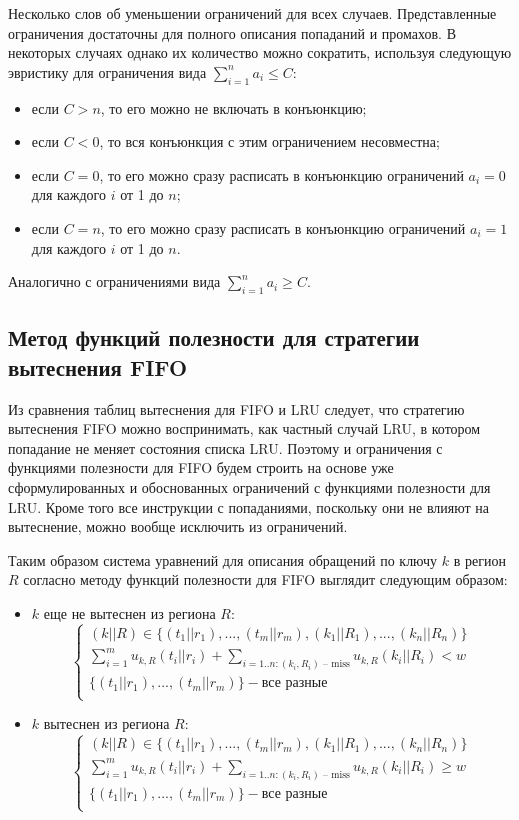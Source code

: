 \documentclass[14pt]{extreport}
\newcommand{\LRU}{\textsf{LRU}\xspace}
\newcommand{\FIFO}{\textsf{FIFO}\xspace}
\begin{document}
Несколько слов об уменьшении ограничений для всех случаев.
Представленные ограничения достаточны для полного описания
попаданий и промахов. В некоторых случаях однако их
количество можно сократить, используя следующую эвристику для ограничения вида
$\sum_{i=1}^n a_i \leqslant C$:
\begin{itemize}
    \item если $C > n$, то его можно не включать в конъюнкцию;
    \item если $C < 0$, то вся конъюнкция с этим ограничением несовместна;
    \item если $C = 0$, то его можно сразу расписать в конъюнкцию ограничений
$a_i = 0$ для каждого $i$ от 1 до $n$;
    \item если $C = n$, то его можно сразу расписать в конъюнкцию ограничений
$a_i = 1$ для каждого $i$ от 1 до $n$.
\end{itemize}

Аналогично с ограничениями вида $\sum_{i=1}^n a_i \geqslant C$.


\subsection{Метод функций полезности для стратегии
вытеснения \FIFO}

Из сравнения таблиц вытеснения для \FIFO и \LRU следует, что
стратегию вытеснения \FIFO можно воспринимать, как частный случай
\LRU, в котором попадание не меняет состояния списка \LRU.
Поэтому и ограничения с функциями полезности для \FIFO будем строить
на основе уже сформулированных и обоснованных ограничений с
функциями полезности для \LRU. Кроме того все инструкции с
попаданиями, поскольку они не влияют на вытеснение, можно вообще
исключить из ограничений.

Таким образом система уравнений для описания обращений по ключу $k$ в регион $R$
согласно методу функций полезности для \FIFO выглядит следующим образом:
\begin{itemize}
\item $k$ еще не вытеснен из региона $R$:
$$
\left\{\begin{array}{l} (k||R) \in \{(t_1||r_1), ..., (t_m||r_m), (k_1||R_1),
..., (k_n||R_n)\}\\
\sum\limits_{i=1}^m u_{k,R}(t_i||r_i) + \sum\limits_{i=1..n:(k_i,R_i)\mbox{~--
miss}} u_{k,R}(k_i||R_i) < w\\
\{(t_1||r_1), ..., (t_m||r_m)\} - \mbox{все разные}\\
\end{array} \right.
$$
\item $k$ вытеснен из региона $R$:
$$
\left\{\begin{array}{l} (k||R) \in \{(t_1||r_1), ..., (t_m||r_m), (k_1||R_1),
..., (k_n||R_n)\}\\
\sum\limits_{i=1}^m u_{k,R}(t_i||r_i) + \sum\limits_{i=1..n:(k_i,R_i)\mbox{~--
miss}} u_{k,R}(k_i||R_i)
\geqslant w\\
\{(t_1||r_1), ..., (t_m||r_m)\} - \mbox{все разные}\\
\end{array} \right.
$$
\end{itemize}
\end{document}
